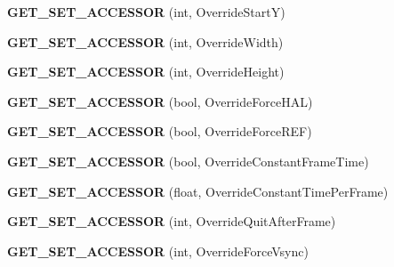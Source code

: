 \begin{DoxyCompactItemize}
\item 
\hypertarget{class_d_x_u_t_state_ad98c1abb28d4379b55f0f4ffb3191f29}{{\bfseries G\+E\+T\+\_\+\+S\+E\+T\+\_\+\+A\+C\+C\+E\+S\+S\+O\+R} (int, Override\+Start\+Y)}\label{class_d_x_u_t_state_ad98c1abb28d4379b55f0f4ffb3191f29}

\item 
\hypertarget{class_d_x_u_t_state_a9dbeab9d6c151fa2b0d3d71311939640}{{\bfseries G\+E\+T\+\_\+\+S\+E\+T\+\_\+\+A\+C\+C\+E\+S\+S\+O\+R} (int, Override\+Width)}\label{class_d_x_u_t_state_a9dbeab9d6c151fa2b0d3d71311939640}

\item 
\hypertarget{class_d_x_u_t_state_a5a9501d43f90b05494198179316d41da}{{\bfseries G\+E\+T\+\_\+\+S\+E\+T\+\_\+\+A\+C\+C\+E\+S\+S\+O\+R} (int, Override\+Height)}\label{class_d_x_u_t_state_a5a9501d43f90b05494198179316d41da}

\item 
\hypertarget{class_d_x_u_t_state_a9a895506bdec9cae22f98d4a2da91cb1}{{\bfseries G\+E\+T\+\_\+\+S\+E\+T\+\_\+\+A\+C\+C\+E\+S\+S\+O\+R} (bool, Override\+Force\+H\+A\+L)}\label{class_d_x_u_t_state_a9a895506bdec9cae22f98d4a2da91cb1}

\item 
\hypertarget{class_d_x_u_t_state_a8b63ee5a944b457d0c4eeae69f93a2a4}{{\bfseries G\+E\+T\+\_\+\+S\+E\+T\+\_\+\+A\+C\+C\+E\+S\+S\+O\+R} (bool, Override\+Force\+R\+E\+F)}\label{class_d_x_u_t_state_a8b63ee5a944b457d0c4eeae69f93a2a4}

\item 
\hypertarget{class_d_x_u_t_state_a0d6827fb6471a413367e889ee923d475}{{\bfseries G\+E\+T\+\_\+\+S\+E\+T\+\_\+\+A\+C\+C\+E\+S\+S\+O\+R} (bool, Override\+Constant\+Frame\+Time)}\label{class_d_x_u_t_state_a0d6827fb6471a413367e889ee923d475}

\item 
\hypertarget{class_d_x_u_t_state_a22c820fde6f74295f8fd04164cf6422e}{{\bfseries G\+E\+T\+\_\+\+S\+E\+T\+\_\+\+A\+C\+C\+E\+S\+S\+O\+R} (float, Override\+Constant\+Time\+Per\+Frame)}\label{class_d_x_u_t_state_a22c820fde6f74295f8fd04164cf6422e}

\item 
\hypertarget{class_d_x_u_t_state_afac280cfbacc515dbdea3e987bfd50a6}{{\bfseries G\+E\+T\+\_\+\+S\+E\+T\+\_\+\+A\+C\+C\+E\+S\+S\+O\+R} (int, Override\+Quit\+After\+Frame)}\label{class_d_x_u_t_state_afac280cfbacc515dbdea3e987bfd50a6}

\item 
\hypertarget{class_d_x_u_t_state_a54cd9b06bcaae901e3acdb1c3b70df3a}{{\bfseries G\+E\+T\+\_\+\+S\+E\+T\+\_\+\+A\+C\+C\+E\+S\+S\+O\+R} (int, Override\+Force\+Vsync)}\label{class_d_x_u_t_state_a54cd9b06bcaae901e3acdb1c3b70df3a}


\end{DoxyCompactItemize}
